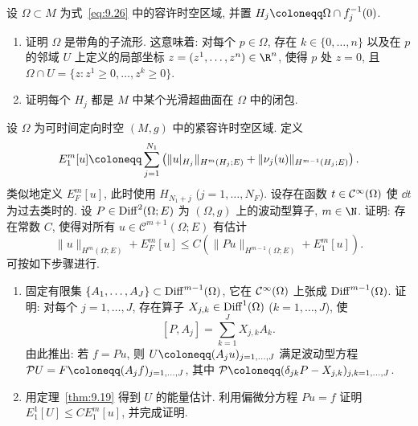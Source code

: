 \begin{exer}[容许时空区域]\label{ex:9.2}
设 $\Omega \subset M$ 为式~\eqref{eq:9.26} 中的容许时空区域, 并置 $H_j \defeq \Omega \cap f_j^{-1}(0)$.
\begin{enumerate}[label=(\arabic*)]
    \item 证明 $\Omega$ 是带角的子流形. 这意味着: 对每个 $p \in \Omega$, 存在 $k \in \{0, \ldots, n\}$ 以及在 $p$ 的邻域 $U$ 上定义的局部坐标 $z = (z^1, \ldots, z^n) \in \R^n$, 使得 $p$ 处 $z = 0$, 且 $\Omega \cap U = \{z : z^1 \ge 0, \ldots, z^k \ge 0\}$.
    \item 证明每个 $H_j$ 都是 $M$ 中某个光滑超曲面在 $\Omega$ 中的闭包.
\end{enumerate}
\end{exer}

\begin{exer}[高阶能量估计]\label{ex:9.3}
设 $\Omega$ 为可时间定向时空 $(M, g)$ 中的紧容许时空区域. 定义
\begin{equation}\label{eq:9.155}
    E_1^m[u] \defeq \sum_{j=1}^{N_1} \left( \|u|_{H_j}\|_{H^m(H_j; E)} + \|\nu_j(u)\|_{H^{m-1}(H_j; E)} \right).
\end{equation}
类似地定义 $E_F^m[u]$, 此时使用 $H_{N_1+j}$ ($j = 1, \ldots, N_F$). 设存在函数 $t \in \mathcal{C}^\infty(\Omega)$ 使 $\dd t$ 为过去类时的. 设 $P \in \operatorname{Diff}^2(\Omega; E)$ 为 $(\Omega, g)$ 上的波动型算子, $m \in \N$. 证明: 存在常数 $C$, 使得对所有 $u \in \mathcal{C}^{m+1}(\Omega; E)$ 有估计
\begin{equation}\label{eq:9.156}
    \|u\|_{H^m(\Omega; E)} + E_F^m[u] \le C \left( \|P u\|_{H^{m-1}(\Omega; E)} + E_1^m[u] \right).
\end{equation}
可按如下步骤进行.
\begin{enumerate}[label=(\arabic*)]
    \item 固定有限集 $\{A_1, \ldots, A_J\} \subset \operatorname{Diff}^{m-1}(\Omega)$, 它在 $\mathcal{C}^\infty(\Omega)$ 上张成 $\operatorname{Diff}^{m-1}(\Omega)$. 证明: 对每个 $j = 1, \ldots, J$, 存在算子 $X_{j,k} \in \operatorname{Diff}^1(\Omega)$ ($k = 1, \ldots, J$), 使
    \begin{equation}\label{eq:9.157}
        [P, A_j] = \sum_{k=1}^{J} X_{j,k} A_k.
    \end{equation}
    由此推出: 若 $f = P u$, 则 $U \defeq (A_j u)_{j=1, \ldots, J}$ 满足波动型方程 $\mathcal{P} U = F \defeq (A_j f)_{j=1, \ldots, J}$, 其中 $\mathcal{P} \defeq (\delta_{jk} P - X_{j,k})_{j,k = 1, \ldots, J}$.
    \item 用定理~\ref{thm:9.19} 得到 $U$ 的能量估计. 利用偏微分方程 $P u = f$ 证明 $E_1^1[U] \le C E_1^m[u]$, 并完成证明.
\end{enumerate}
\end{exer}

